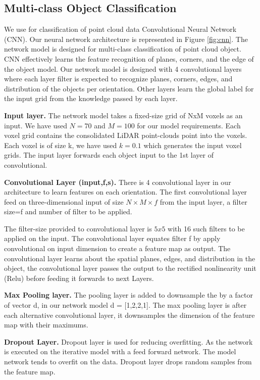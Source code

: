 \subsection{Multi-class Object Classification} 
We use for classification of point cloud data Convolutional Neural Network (CNN).
Our neural network architecture is represented in Figure \ref{fig:cnn}.
The network model is designed for multi-class classification of point cloud object.
CNN effectively learns the feature recognition of planes, corners, and the edge of the object model.
Our network model is designed with 4 convolutional layers where each layer filter is expected to
recognize planes, corners, edges, and distribution of the objects per orientation.
Other layers learn the global label for the input grid from the knowledge passed by each layer.

\textbf{Input layer.}
The network model takes a fixed-size grid of NxM voxels as an input. We have 
used $N=70$ and $M=100$ for our model requirements. Each voxel grid contains the consolidated LiDAR point-clouds point into the voxels. 
Each voxel is of size k, we have used $k=0.1$ which generates the input voxel grids. The input layer forwards each object input to the 1st layer
of convolutional.


\textbf{Convolutional Layer (input,f,s).}
There is 4 convolutional layer in our architecture to learn features on each orientation.
The first convolutional layer feed on three-dimensional input of size $N \times  M \times f$ from
the input layer, a filter size=f and number of filter to be applied.

The filter-size provided to convolutional layer is $5x5$ with 16 such filters to be applied on the input.
The convolutional layer equates filter f by apply convolutional on input dimension to create a feature map as output.
The convolutional layer learns about the spatial planes, edges, and distribution in the object, 
the convolutional layer passes the output to the rectified nonlinearity unit (Relu) before feeding
it forwards to next Layers.

\textbf{Max Pooling layer.} 
The pooling layer is added to downsample the by a factor of vector d, in
our network model d = [1,2,2,1]. The max pooling layer is after each alternative convolutional
layer, it downsamples the dimension of the feature map with their maximums.

\textbf{Dropout Layer.}
Dropout layer is used for reducing overfitting. As the network is executed on the iterative model with a feed forward network.
The model network tends to overfit on the data. Dropout layer drops random samples from the feature
map.


